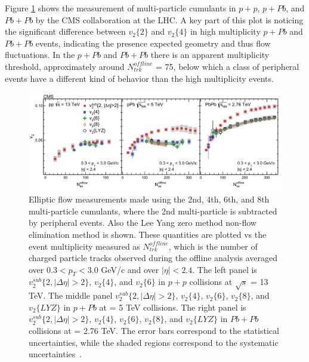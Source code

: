 Figure \ref{fig:pp_pPb_PbPb_cumulants} shows the measurement of multi-particle cumulants in $p+p$, $p+Pb$, and $Pb+Pb$ by the CMS collaboration at the LHC. A key part of this plot is noticing the significant difference between $v_2\{2\}$ and $v_2\{4\}$ in high multiplicity $p+Pb$ and $Pb+Pb$ events, indicating the presence expected geometry and thus flow fluctuations. In the $p+Pb$ and $Pb+Pb$ there is an apparent multiplicity threshold, approximately around $N^{offline}_{trk}$ = 75, below which a class of peripheral events have a different kind of behavior than the high multiplicity events. 
\begin{figure}[!ht]
\begin{center}
\includegraphics[width=0.95\linewidth]{figs/pp_pPb_PbPb_cumulants.PNG}
\caption{Elliptic flow measurements made using the 2nd, 4th, 6th, and 8th multi-particle cumulants, where the 2nd multi-particle is subtracted by peripheral events. Also the Lee Yang zero method non-flow elimination method is shown. These quantities are plotted vs the event multiplicity measured as $N^{offline}_{trk}$, which is the number of charged particle tracks observed during the offline analysis averaged over  $0.3 < p_T < 3.0$ GeV/c and over $|\eta| < 2.4$. The left panel is $v^{sub}_2\{2,|\Delta\eta|> 2\}$, $v_2\{4\}$, and $v_2\{6\}$ in $p+p$ collisions at $\sqrt{s}$ = 13 TeV. The middle panel $v^{sub}_2\{2,|\Delta\eta|> 2\}$, $v_2\{4\}$, $v_2\{6\}$, $v_2\{8\}$, and $v_2\{LYZ\}$ in $p+Pb$ at \sqsn = 5 TeV collisions. The right panel is  $v^{sub}_2\{2,|\Delta\eta|> 2\}$, $v_2\{4\}$, $v_2\{6\}$, $v_2\{8\}$, and $v_2\{LYZ\}$ in $Pb+Pb$ collisions at \sqsn = 2.76 TeV. The error bars correspond to the statistical uncertainties, while the shaded regions correspond to the systematic uncertainties~\cite{Khachatryan2017193}.}
\label{fig:pp_pPb_PbPb_cumulants}
\end{center}
\end{figure}

